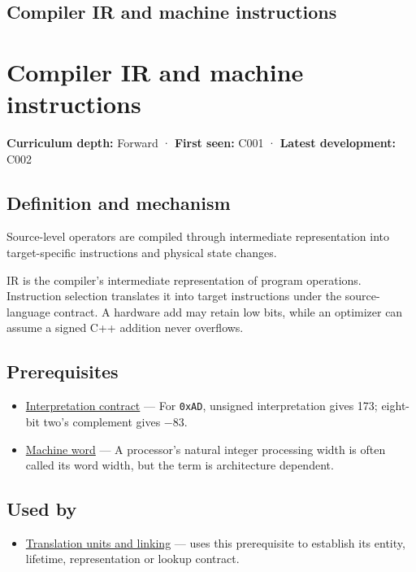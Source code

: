 \hypertarget{appendix-942ad41afb30}{}
\section*{Compiler IR and machine instructions}
\chapter{Compiler IR and machine instructions}\label{appendix-942ad41afb30-compiler-ir-and-machine-instructions}

\textbf{Curriculum depth:} Forward · \textbf{First seen:} C001 · \textbf{Latest development:} C002

\section{Definition and mechanism}\label{appendix-942ad41afb30-definition-and-mechanism}

Source-level operators are compiled through intermediate representation into target-specific instructions and physical state changes.

IR is the compiler's intermediate representation of program operations. Instruction selection translates it into target instructions under the source-language contract. A hardware add may retain low bits, while an optimizer can assume a signed C++ addition never overflows.

\section{Prerequisites}\label{appendix-942ad41afb30-prerequisites}

\begin{itemize}
\tightlist
\item
  \hyperref[appendix-f414bd4ed05c]{Interpretation contract} --- For \texttt{0xAD}, unsigned interpretation gives 173; eight-bit two's complement gives −83.
\item
  \hyperref[appendix-d67a19507dc5]{Machine word} --- A processor's natural integer processing width is often called its word width, but the term is architecture dependent.
\end{itemize}

\section{Used by}\label{appendix-942ad41afb30-used-by}

\begin{itemize}
\tightlist
\item
  \hyperref[appendix-806686359e1b]{Translation units and linking} --- uses this prerequisite to establish its entity, lifetime, representation or lookup contract.
\end{itemize}

